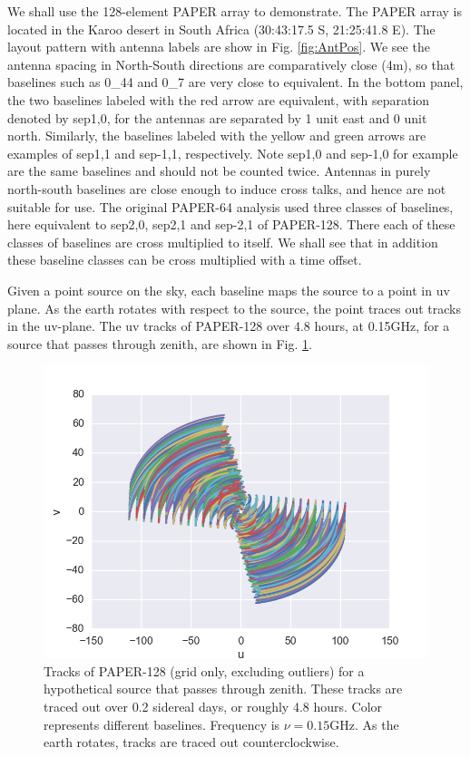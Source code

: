 \documentclass[preprint2,numberedappendix,tighten,twocolappendix]{aastex6}  %
\renewcommand\[{\begin{equation}}
\renewcommand\]{\end{equation}}
\begin{document}
We shall use the 128-element PAPER array to demonstrate. 
The PAPER array is located in the Karoo desert in South Africa (30:43:17.5
S, 21:25:41.8 E). The layout pattern with antenna labels are show
in Fig. \ref{fig:AntPos}. We see the antenna spacing in North-South
directions are comparatively close (4m), so that baselines such as
0\_44 and 0\_7 are very close to equivalent. In the bottom panel,
the two baselines labeled with the red arrow are equivalent, with
separation denoted by sep1,0, for the antennas are separated by 1
unit east and 0 unit north. Similarly, the baselines labeled with
the yellow and green arrows are examples of sep1,1 and sep-1,1, respectively.
Note sep1,0 and sep-1,0 for example are the same baselines and should
not be counted twice. Antennas in purely north-south baselines
are close enough to induce cross talks, and hence are not suitable
for use. The original PAPER-64 analysis used three classes of baselines, here
equivalent to 
sep2,0, sep2,1 and sep-2,1 \cite{Ali2015} of PAPER-128. There each of these classes
of baselines are cross multiplied to itself. We shall see that in addition these
baseline classes can be cross multiplied with a time offset.


Given a point source on the sky, each baseline maps the
source to a point in uv plane. As the earth rotates with respect to
the source, the point traces out tracks in the uv-plane. 
The uv tracks of PAPER-128 over 4.8 hours, at 0.15GHz, for a source that passes through zenith, are shown in Fig. \ref{fig:Tracks}. 


\begin{figure}[H]
\includegraphics[width=\linewidth]{tracks128}
\caption{Tracks of PAPER-128 (grid only, excluding outliers) for a hypothetical source that passes through zenith.
These tracks are traced out over 0.2 sidereal days, or roughly 4.8
hours. Color represents different baselines. Frequency is $\nu=0.15\text{GHz}$.
As the earth rotates, tracks are traced out counterclockwise. \label{fig:Tracks}}
\end{figure}
\end{document}
